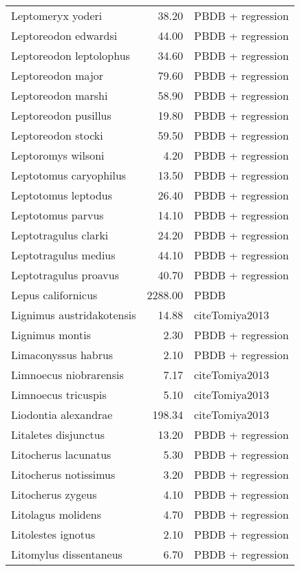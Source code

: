 \begin{table}[ht]
\begin{tabular}{lrl}
  Leptomeryx yoderi & 38.20 & PBDB + regression \\ 
  Leptoreodon edwardsi & 44.00 & PBDB + regression \\ 
  Leptoreodon leptolophus & 34.60 & PBDB + regression \\ 
  Leptoreodon major & 79.60 & PBDB + regression \\ 
  Leptoreodon marshi & 58.90 & PBDB + regression \\ 
  Leptoreodon pusillus & 19.80 & PBDB + regression \\ 
  Leptoreodon stocki & 59.50 & PBDB + regression \\ 
  Leptoromys wilsoni & 4.20 & PBDB + regression \\ 
  Leptotomus caryophilus & 13.50 & PBDB + regression \\ 
  Leptotomus leptodus & 26.40 & PBDB + regression \\ 
  Leptotomus parvus & 14.10 & PBDB + regression \\ 
  Leptotragulus clarki & 24.20 & PBDB + regression \\ 
  Leptotragulus medius & 44.10 & PBDB + regression \\ 
  Leptotragulus proavus & 40.70 & PBDB + regression \\ 
  Lepus californicus & 2288.00 & PBDB \\ 
  Lignimus austridakotensis & 14.88 & cite{Tomiya2013} \\ 
  Lignimus montis & 2.30 & PBDB + regression \\ 
  Limaconyssus habrus & 2.10 & PBDB + regression \\ 
  Limnoecus niobrarensis & 7.17 & cite{Tomiya2013} \\ 
  Limnoecus tricuspis & 5.10 & cite{Tomiya2013} \\ 
  Liodontia alexandrae & 198.34 & cite{Tomiya2013} \\ 
  Litaletes disjunctus & 13.20 & PBDB + regression \\ 
  Litocherus lacunatus & 5.30 & PBDB + regression \\ 
  Litocherus notissimus & 3.20 & PBDB + regression \\ 
  Litocherus zygeus & 4.10 & PBDB + regression \\ 
  Litolagus molidens & 4.70 & PBDB + regression \\ 
  Litolestes ignotus & 2.10 & PBDB + regression \\ 
  Litomylus dissentaneus & 6.70 & PBDB + regression \\ 

\end{tabular}
\end{table}
